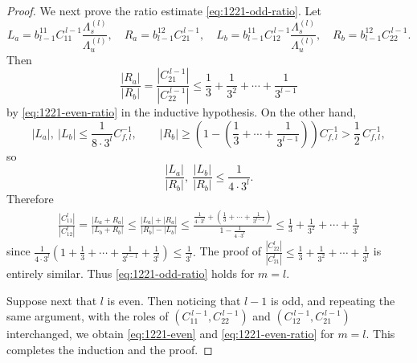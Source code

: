 \documentclass[10pt,a4paper]{amsart}
\begin{document}
\begin{proof}
We next prove the ratio estimate \eqref{eq:1221-odd-ratio}.
Let
\[
L_a=b_{l-1}^{11}C_{11}^{\,l-1}\frac{\Lambda_s^{(l)}}{\Lambda_u^{(l)}},
\quad
R_a=b_{l-1}^{12}C_{21}^{\,l-1},\quad
L_b=b_{l-1}^{11}C_{12}^{\,l-1}\frac{\Lambda_s^{(l)}}{\Lambda_u^{(l)}},
\quad
R_b=b_{l-1}^{12}C_{22}^{\,l-1}.
\]
Then
\[
\frac{|R_a|}{|R_b|}
=
\frac{|C_{21}^{\,l-1}|}{|C_{22}^{\,l-1}|}
\le
\frac{1}{3}+\frac{1}{3^2}+\cdots +\frac{1}{3^{l-1}}
\]
by \eqref{eq:1221-even-ratio} in the inductive hypothesis. On the other hand,
\[
|L_a|,\ |L_b|
\le
\frac{1}{8\cdot 3^l}C_{f,l}^{-1},
\qquad
|R_b|
\ge
\left(1-\left(\frac{1}{3}+\cdots +\frac{1}{3^{l-1}}\right)\right)C_{f,l}^{-1}
>
\frac12\,C_{f,l}^{-1},
\]
so
\[
\frac{|L_a|}{|R_b|},\ \frac{|L_b|}{|R_b|}
\le
\frac{1}{4\cdot 3^l}.
\]
Therefore
\begin{align*}
\frac{|C_{11}^{l}|}{|C_{12}^{l}|}
=
\frac{|L_a+R_a|}{|L_b+R_b|}
\le
\frac{|L_a|+|R_a|}{|R_b|-|L_b|}
\le
\frac{\frac{1}{4\cdot 3^l}
+\left(\frac{1}{3}+\cdots +\frac{1}{3^{l-1}}\right)}
{1-\frac{1}{4\cdot 3^l}}
\le
\frac{1}{3}+\frac{1}{3^2}+\cdots +\frac{1}{3^{l}}
\end{align*}
since
$
\frac{1}{4\cdot 3^l}
(
1+\frac{1}{3}+\cdots +\frac{1}{3^{l-1}}+\frac{1}{3^l}
)
\le \frac{1}{3^l}.
$
The proof of
$
\frac{|C_{22}^{l}|}{|C_{21}^{l}|}
\le
\frac{1}{3}+\frac{1}{3^2}+\cdots +\frac{1}{3^{l}}
$
is entirely similar. Thus \eqref{eq:1221-odd-ratio}
holds for $m=l$.

Suppose next that $l$ is even. Then noticing that $l-1$ is odd, 
and repeating the same argument, with the roles of
$(C_{11}^{\,l-1},C_{22}^{\,l-1})$ and $(C_{12}^{\,l-1},C_{21}^{\,l-1})$
interchanged, we obtain
\eqref{eq:1221-even} and \eqref{eq:1221-even-ratio}
for $m=l$.
This completes the induction and the proof.
\end{proof}
\end{document}
